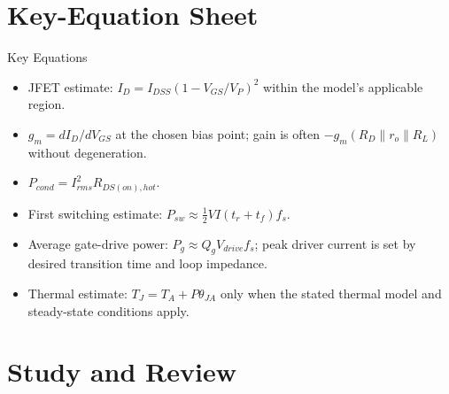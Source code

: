 \documentclass[10pt,letterpaper]{article}
\begin{document}
\section{Key-Equation Sheet}
\begin{CornellExamBox}{Key Equations}
\begin{itemize}
  \item JFET estimate: $I_D=I_{DSS}(1-V_{GS}/V_P)^2$ within the model's applicable region.
  \item $g_m=dI_D/dV_{GS}$ at the chosen bias point; gain is often $-g_m(R_D\parallel r_o\parallel R_L)$ without degeneration.
  \item $P_{cond}=I_{rms}^2R_{DS(on),hot}$.
  \item First switching estimate: $P_{sw}\approx\tfrac12VI(t_r+t_f)f_s$.
  \item Average gate-drive power: $P_g\approx Q_gV_{drive}f_s$; peak driver current is set by desired transition time and loop impedance.
  \item Thermal estimate: $T_J=T_A+P\theta_{JA}$ only when the stated thermal model and steady-state conditions apply.
\end{itemize}\end{CornellExamBox}
\section{Study and Review}
\end{document}
